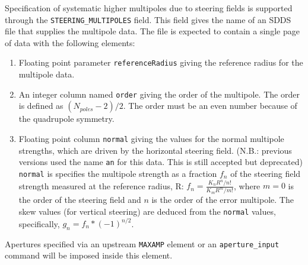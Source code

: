 Specification of systematic higher multipoles due to steering fields is
supported through the \verb|STEERING_MULTIPOLES| field.  This field gives the
name of an SDDS file that supplies the multipole data.  The file is
expected to contain a single page of data with the following elements:
\begin{enumerate}
\item Floating point parameter {\tt referenceRadius} giving the reference
 radius for the multipole data.
\item An integer column named {\tt order} giving the order of the multipole.
The order is defined as $(N_{poles}-2)/2$.  The order must be an even number
because of the quadrupole symmetry.
\item Floating point column {\tt normal} giving the values for the normal
multipole strengths, which are driven by the horizontal steering field.
(N.B.: previous versions used the name {\tt an} for this data. This is still accepted but deprecated)
{\tt normal} is specifies the multipole strength as a fraction $f_n$ of the steering field strength measured at the reference radius, R: 
$f_n = \frac{K_n R^n / n!}{K_m R^m / m!}$, where 
$m=0$ is the order of the steering field and $n$ is the order of the error multipole.
The skew values (for vertical steering) are deduced from the {\tt normal} values, specifically,
$g_n = f_n*(-1)^{n/2}$.
\end{enumerate}

Apertures specified via an upstream \verb|MAXAMP| element or an \verb|aperture_input|
command will be imposed inside this element.
